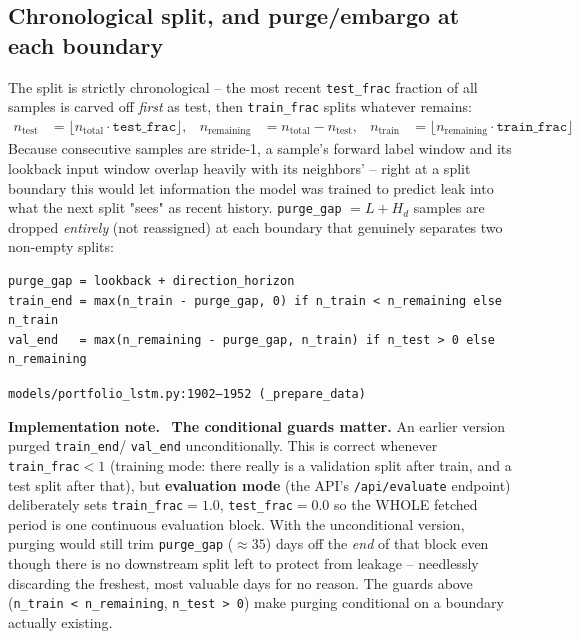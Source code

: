 \documentclass[11pt]{article}
\newcommand{\srcref}[1]{\hfill\textcolor{cmtcolor}{\footnotesize\texttt{#1}}}
\newcommand{\code}[1]{\texttt{\small #1}}
\newcommand{\fixnotelabel}{\small\textbf{Implementation note.}~}
\begin{document}
\subsection{Chronological split, and purge/embargo at each boundary}
\label{sec:split}

The split is strictly chronological -- the most recent \code{test\_frac} fraction of all
samples is carved off \emph{first} as test, then \code{train\_frac} splits whatever remains:
\begin{align}
  n_{\text{test}} &= \lfloor n_{\text{total}} \cdot \texttt{test\_frac} \rfloor, &
  n_{\text{remaining}} &= n_{\text{total}} - n_{\text{test}}, &
  n_{\text{train}} &= \lfloor n_{\text{remaining}} \cdot \texttt{train\_frac} \rfloor
\end{align}
Because consecutive samples are stride-1, a sample's forward label window and its lookback
input window overlap heavily with its neighbors' -- right at a split boundary this would let
information the model was trained to predict leak into what the next split "sees" as recent
history. \code{purge\_gap} $= L + H_d$ samples are dropped \emph{entirely} (not reassigned)
at each boundary that genuinely separates two non-empty splits:
\begin{lstlisting}[caption={Purge/embargo - only at a boundary that actually separates two splits.}, label=lst:purge]
purge_gap = lookback + direction_horizon
train_end = max(n_train - purge_gap, 0) if n_train < n_remaining else n_train
val_end   = max(n_remaining - purge_gap, n_train) if n_test > 0 else n_remaining
\end{lstlisting}
\srcref{models/portfolio\_lstm.py:1902--1952 (\texttt{\_prepare\_data})}

\begin{fixnote}\fixnotelabel
\textbf{The conditional guards matter.} An earlier version purged \code{train\_end}/
\code{val\_end} unconditionally. This is correct whenever \texttt{train\_frac}$<1$ (training
mode: there really is a validation split after train, and a test split after that), but
\textbf{evaluation mode} (the API's \code{/api/evaluate} endpoint) deliberately sets
\texttt{train\_frac}$=1.0$, \texttt{test\_frac}$=0.0$ so the WHOLE fetched period is one
continuous evaluation block. With the unconditional version, purging would still trim
\code{purge\_gap} ($\approx 35$) days off the \emph{end} of that block even though there is
no downstream split left to protect from leakage -- needlessly discarding the freshest,
most valuable days for no reason. The guards above (\code{n\_train < n\_remaining},
\code{n\_test > 0}) make purging conditional on a boundary actually existing.
\end{fixnote}
\end{document}
